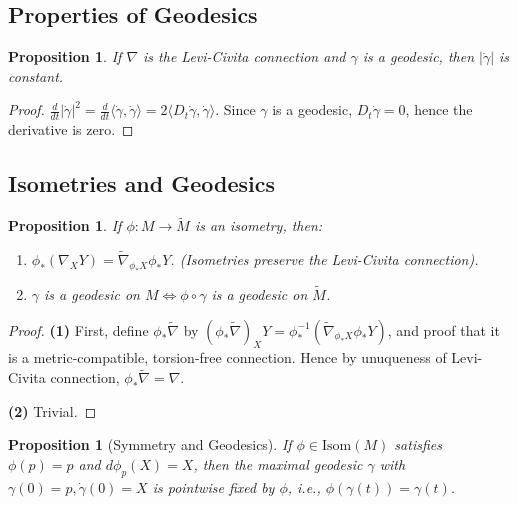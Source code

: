 \documentclass[11pt, a4paper]{article}
\theoremstyle{plain}
\newtheorem{proposition}[theorem]{Proposition}
\theoremstyle{definition}
\theoremstyle{remark}
\begin{document}
\subsection{Properties of Geodesics}

\begin{proposition}
If $\nabla$ is the Levi-Civita connection and $\gamma$ is a geodesic, then $|\dot{\gamma}|$ is constant.
\end{proposition}

\begin{proof}
$\frac{d}{dt} |\dot{\gamma}|^2 = \frac{d}{dt} \langle \dot{\gamma}, \dot{\gamma} \rangle = 2 \langle D_t \dot{\gamma}, \dot{\gamma} \rangle$. Since $\gamma$ is a geodesic, $D_t \dot{\gamma} = 0$, hence the derivative is zero.
\end{proof}

\subsection{Isometries and Geodesics}

\begin{proposition}
If $\phi: M \to \tilde{M}$ is an isometry, then:
\begin{enumerate}
    \item $\phi_* (\nabla_X Y) = \tilde{\nabla}_{\phi_* X} \phi_* Y$. (Isometries preserve the Levi-Civita connection).
    \item $\gamma$ is a geodesic on $M \iff \phi \circ \gamma$ is a geodesic on $\tilde{M}$.
\end{enumerate}
\end{proposition}
\newcommand{\tnba}{\tilde{\nabla}}

\begin{proof}
    \textbf{(1)} First, define $\phi_*\tnba$ by $(\phi_*\tnba)_X Y = \phi_*^{-1}(\tnba_{\phi_* X} \phi_* Y)$, and proof that it is a 
    metric-compatible, torsion-free connection. Hence by unuqueness of Levi-Civita connection, $\phi_*\tnba = \nabla$.

    \textbf{(2)} Trivial.
\end{proof}


\begin{proposition}[Symmetry and Geodesics]
If $\phi \in \text{Isom}(M)$ satisfies $\phi(p)=p$ and $d\phi_p(X)=X$, then the maximal geodesic $\gamma$ with $\gamma(0)=p, \dot{\gamma}(0)=X$ is pointwise fixed by $\phi$, i.e., $\phi(\gamma(t)) = \gamma(t)$.
\end{proposition}
\end{document}
